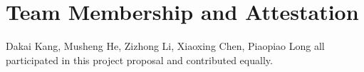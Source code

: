 \section{Team Membership and Attestation}
Dakai Kang, Musheng He, Zizhong Li, Xiaoxing Chen, Piaopiao Long all participated in this project proposal and contributed equally.
